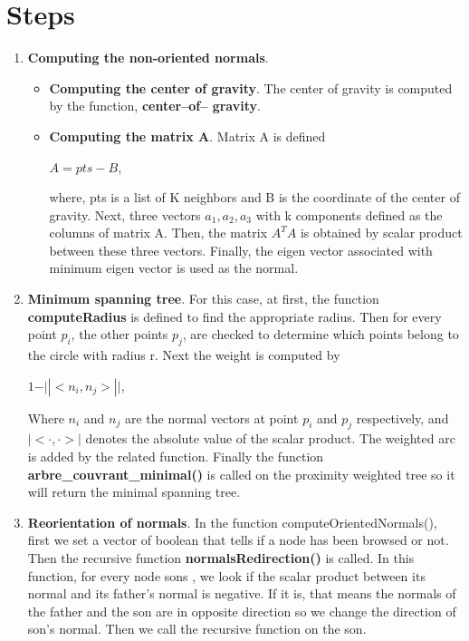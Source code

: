 \documentclass[11pt,a4paper]{article}
\begin{document}
 


\pagestyle{fancy}
 


\section{Steps}
\begin{enumerate}
\item \textbf{Computing the non-oriented normals}.
\begin{itemize}
\item \textbf{Computing the center of gravity}. The center of gravity is computed by the function, \textbf{center--of--
gravity}.
\item \textbf{Computing the matrix A}. Matrix A is defined 
\begin{center}
$A=pts-B$,
\end{center}
where, pts is a list of K neighbors and B is the coordinate of the center of gravity. Next, three vectors  $a_{1}, a_{2}, a_{3}$ with k components defined as the columns of matrix A. Then, the matrix $A^{T}A$ is obtained by scalar product between these three vectors. Finally, the eigen vector associated with minimum eigen vector is used as the normal.
\end{itemize}
\item \textbf{Minimum spanning tree}. For this case, at first, the function \textbf{computeRadius} is defined to find the appropriate radius. Then for every point $p_{i}$, the other points $p_{j}$, are checked to determine which points belong to the circle with radius r.
Next the weight is computed by 
\begin{center}
 $1-\vert | <n_{i}, n_{j}> | \vert$,
 \end{center} 
 Where $n_{i}$ and $n_{j}$ are the normal vectors at point $p_{i}$ and $p_{j}$ respectively, and $| <\cdot ,\cdot> |$ denotes the absolute value of the scalar product.
The weighted arc is added by the related function.
Finally the function \textbf{arbre\_couvrant\_minimal()} is called on the proximity weighted tree so it will return the minimal spanning tree.
\item \textbf{Reorientation of normals}. 
In the function computeOrientedNormals(),  first we set a vector of boolean that tells if a node has been browsed or not.
Then the recursive function \textbf{normalsRedirection()} is called. In this function, for every node sons , we look if the scalar product between its normal and its father's normal is negative. If it is, that means the normals of the father and the son are in opposite direction so we change the direction of son's normal. Then we call the recursive function on the son.


\end{enumerate}
\end{document}

